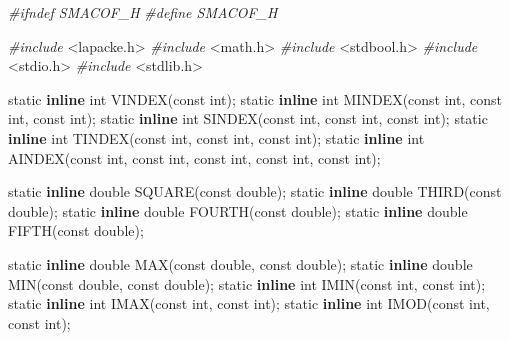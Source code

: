 \documentclass[12pt,]{article}
\newenvironment{Shaded}{\begin{snugshade}}{\end{snugshade}}
\newcommand{\KeywordTok}[1]{\textcolor[rgb]{0.13,0.29,0.53}{\textbf{#1}}}
\newcommand{\DataTypeTok}[1]{\textcolor[rgb]{0.13,0.29,0.53}{#1}}
\newcommand{\ImportTok}[1]{#1}
\newcommand{\PreprocessorTok}[1]{\textcolor[rgb]{0.56,0.35,0.01}{\textit{#1}}}
\newcommand{\NormalTok}[1]{#1}
\begin{document}
\begin{Shaded}
\begin{Highlighting}[]
\PreprocessorTok{#ifndef SMACOF_H}
\PreprocessorTok{#define SMACOF_H}

\PreprocessorTok{#include }\ImportTok{<lapacke.h>}
\PreprocessorTok{#include }\ImportTok{<math.h>}
\PreprocessorTok{#include }\ImportTok{<stdbool.h>}
\PreprocessorTok{#include }\ImportTok{<stdio.h>}
\PreprocessorTok{#include }\ImportTok{<stdlib.h>}

\DataTypeTok{static} \KeywordTok{inline} \DataTypeTok{int}\NormalTok{ VINDEX(}\DataTypeTok{const} \DataTypeTok{int}\NormalTok{);}
\DataTypeTok{static} \KeywordTok{inline} \DataTypeTok{int}\NormalTok{ MINDEX(}\DataTypeTok{const} \DataTypeTok{int}\NormalTok{, }\DataTypeTok{const} \DataTypeTok{int}\NormalTok{, }\DataTypeTok{const} \DataTypeTok{int}\NormalTok{);}
\DataTypeTok{static} \KeywordTok{inline} \DataTypeTok{int}\NormalTok{ SINDEX(}\DataTypeTok{const} \DataTypeTok{int}\NormalTok{, }\DataTypeTok{const} \DataTypeTok{int}\NormalTok{, }\DataTypeTok{const} \DataTypeTok{int}\NormalTok{);}
\DataTypeTok{static} \KeywordTok{inline} \DataTypeTok{int}\NormalTok{ TINDEX(}\DataTypeTok{const} \DataTypeTok{int}\NormalTok{, }\DataTypeTok{const} \DataTypeTok{int}\NormalTok{, }\DataTypeTok{const} \DataTypeTok{int}\NormalTok{);}
\DataTypeTok{static} \KeywordTok{inline} \DataTypeTok{int}\NormalTok{ AINDEX(}\DataTypeTok{const} \DataTypeTok{int}\NormalTok{, }\DataTypeTok{const} \DataTypeTok{int}\NormalTok{, }\DataTypeTok{const} \DataTypeTok{int}\NormalTok{, }\DataTypeTok{const} \DataTypeTok{int}\NormalTok{, }\DataTypeTok{const} \DataTypeTok{int}\NormalTok{);}

\DataTypeTok{static} \KeywordTok{inline} \DataTypeTok{double}\NormalTok{ SQUARE(}\DataTypeTok{const} \DataTypeTok{double}\NormalTok{);}
\DataTypeTok{static} \KeywordTok{inline} \DataTypeTok{double}\NormalTok{ THIRD(}\DataTypeTok{const} \DataTypeTok{double}\NormalTok{);}
\DataTypeTok{static} \KeywordTok{inline} \DataTypeTok{double}\NormalTok{ FOURTH(}\DataTypeTok{const} \DataTypeTok{double}\NormalTok{);}
\DataTypeTok{static} \KeywordTok{inline} \DataTypeTok{double}\NormalTok{ FIFTH(}\DataTypeTok{const} \DataTypeTok{double}\NormalTok{);}

\DataTypeTok{static} \KeywordTok{inline} \DataTypeTok{double}\NormalTok{ MAX(}\DataTypeTok{const} \DataTypeTok{double}\NormalTok{, }\DataTypeTok{const} \DataTypeTok{double}\NormalTok{);}
\DataTypeTok{static} \KeywordTok{inline} \DataTypeTok{double}\NormalTok{ MIN(}\DataTypeTok{const} \DataTypeTok{double}\NormalTok{, }\DataTypeTok{const} \DataTypeTok{double}\NormalTok{);}
\DataTypeTok{static} \KeywordTok{inline} \DataTypeTok{int}\NormalTok{ IMIN(}\DataTypeTok{const} \DataTypeTok{int}\NormalTok{, }\DataTypeTok{const} \DataTypeTok{int}\NormalTok{);}
\DataTypeTok{static} \KeywordTok{inline} \DataTypeTok{int}\NormalTok{ IMAX(}\DataTypeTok{const} \DataTypeTok{int}\NormalTok{, }\DataTypeTok{const} \DataTypeTok{int}\NormalTok{);}
\DataTypeTok{static} \KeywordTok{inline} \DataTypeTok{int}\NormalTok{ IMOD(}\DataTypeTok{const} \DataTypeTok{int}\NormalTok{, }\DataTypeTok{const} \DataTypeTok{int}\NormalTok{);}


\end{Highlighting}
\end{Shaded}
\end{document}
